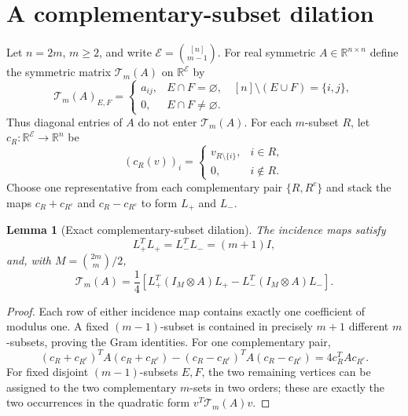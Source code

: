\documentclass[11pt]{article}
\newtheorem{lemma}[theorem]{Lemma}
\theoremstyle{remark}\newtheorem{remark}[theorem]{Remark}
\newcommand{\R}{\mathbb R}\newcommand{\op}{\mathrm{op}}
\begin{document}
\section{A complementary-subset dilation}
Let $n=2m$, $m\ge2$, and write $\mathcal E=\binom{[n]}{m-1}$.
For real symmetric $A\in\R^{n\times n}$ define the symmetric matrix
$\mathcal T_m(A)$ on $\R^{\mathcal E}$ by
\begin{equation}\label{eq:operator}
\mathcal T_m(A)_{E,F}=
\begin{cases}
a_{ij},&E\cap F=\varnothing,\quad[n]\setminus(E\cup F)=\{i,j\},\\
0,&E\cap F\ne\varnothing.
\end{cases}
\end{equation}
Thus diagonal entries of $A$ do not enter $\mathcal T_m(A)$.
For each $m$-subset $R$, let $c_R:\R^{\mathcal E}\to\R^n$ be
\[
(c_R(v))_i=\begin{cases}v_{R\setminus\{i\}},&i\in R,\\0,&i\notin R.\end{cases}
\]
Choose one representative from each complementary pair $\{R,R^c\}$ and
stack the maps $c_R+c_{R^c}$ and $c_R-c_{R^c}$ to form $L_+$ and $L_-$.

\begin{lemma}[Exact complementary-subset dilation]\label{lem:dilation}
The incidence maps satisfy
\[
L_+^TL_+=L_-^TL_-=(m+1)I,
\]
and, with $M=\binom{2m}{m}/2$,
\begin{equation}\label{eq:dilation}
\mathcal T_m(A)=\frac14\left[
L_+^T(I_M\otimes A)L_+-L_-^T(I_M\otimes A)L_-
\right].
\end{equation}
\end{lemma}
\begin{proof}
Each row of either incidence map contains exactly one coefficient of modulus
one.  A fixed $(m-1)$-subset is contained in precisely $m+1$ different
$m$-subsets, proving the Gram identities.  For one complementary pair,
\[
(c_R+c_{R^c})^TA(c_R+c_{R^c})-
(c_R-c_{R^c})^TA(c_R-c_{R^c})=4c_R^TAc_{R^c}.
\]
For fixed disjoint $(m-1)$-subsets $E,F$, the two remaining vertices can be
assigned to the two complementary $m$-sets in two orders; these are exactly
the two occurrences in the quadratic form $v^T\mathcal T_m(A)v$.
\end{proof}
\end{document}
